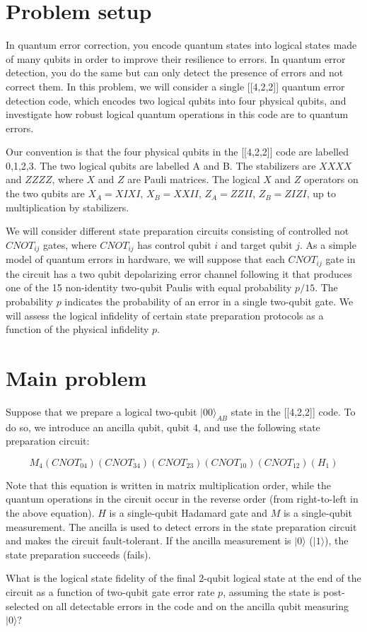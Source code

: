 \documentclass{article}
\begin{document}
\section*{Problem setup}
In quantum error correction, you encode quantum states into logical states made of many qubits in order to improve their resilience to errors. In quantum error detection, you do the same but can only detect the presence of errors and not correct them. In this problem, we will consider a single [[4,2,2]] quantum error detection code, which encodes two logical qubits into four physical qubits, and investigate how robust logical quantum operations in this code are to quantum errors.

Our convention is that the four physical qubits in the [[4,2,2]] code are labelled 0,1,2,3. The two logical qubits are labelled A and B. The stabilizers are $XXXX$ and $ZZZZ$, where $X$ and $Z$ are Pauli matrices. The logical $X$ and $Z$ operators on the two qubits are $X_A = XIXI$, $X_B=XXII$, $Z_A = ZZII$, $Z_B = ZIZI$, up to multiplication by stabilizers.

We will consider different state preparation circuits consisting of controlled not $CNOT_{ij}$ gates, where $CNOT_{ij}$ has control qubit $i$ and target qubit $j$. As a simple model of quantum errors in hardware, we will suppose that each $CNOT_{ij}$ gate in the circuit has a two qubit depolarizing error channel following it that produces one of the 15 non-identity two-qubit Paulis with equal probability $p/15$. The probability $p$ indicates the probability of an error in a single two-qubit gate. We will assess the logical infidelity of certain state preparation protocols as a function of the physical infidelity $p$.

\section*{Main problem}

Suppose that we prepare a logical two-qubit $|00\rangle_{AB}$ state in the [[4,2,2]] code. To do so, we introduce an ancilla qubit, qubit 4, and use the following state preparation circuit:

\[M_4 (CNOT_{04}) (CNOT_{34}) (CNOT_{23}) (CNOT_{10}) (CNOT_{12}) (H_1) \]

Note that this equation is written in matrix multiplication order, while the quantum operations in the circuit occur in the reverse order (from right-to-left in the above equation).  $H$ is a single-qubit Hadamard gate and $M$ is a single-qubit measurement. The ancilla is used to detect errors in the state preparation circuit and makes the circuit fault-tolerant. If the ancilla measurement is $|0\rangle$ ($|1\rangle$), the state preparation succeeds (fails).

What is the logical state fidelity of the final 2-qubit logical state at the end of the circuit as a function of two-qubit gate error rate $p$, assuming the state is post-selected on all detectable errors in the code and on the ancilla qubit measuring $|0\rangle$?
\end{document}
